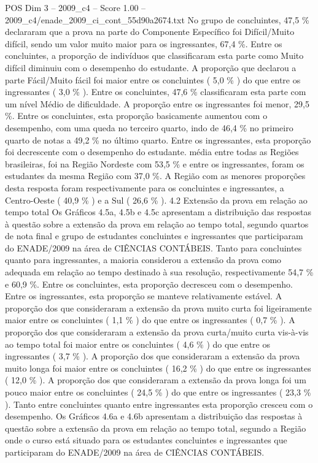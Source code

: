 \begin{textsample}{POS Dim 3 – 2009\_c4 – Score 1.00 – 2009\_c4/enade\_2009\_ci\_cont\_55d90a2674.txt}
No grupo de concluintes, 47,5 \% declararam que a prova na parte do Componente Específico foi Difícil/Muito difícil, sendo um valor muito maior para os ingressantes, 67,4 \%.
Entre os concluintes, a proporção de indivíduos que classificaram esta parte como Muito difícil diminuiu com o desempenho do estudante.
A proporção que declarou a parte Fácil/Muito fácil foi maior entre os concluintes ( 5,0 \% ) do que entre os ingressantes ( 3,0 \% ).
Entre os concluintes, 47,6 \% classificaram esta parte com um nível Médio de dificuldade.
A proporção entre os ingressantes foi menor, 29,5 \%.
Entre os concluintes, esta proporção basicamente aumentou com o desempenho, com uma queda no terceiro quarto, indo de 46,4 \% no primeiro quarto de notas a 49,2 \% no último quarto.
Entre os ingressantes, esta proporção foi decrescente com o desempenho do estudante. média entre todas as Regiões brasileiras, foi na Região Nordeste com 53,5 \% e entre os ingressantes, foram os estudantes da mesma Região com 37,0 \%.
A Região com as menores proporções desta resposta foram respectivamente para os concluintes e ingressantes, a Centro-Oeste ( 40,9 \% ) e a Sul ( 26,6 \% ). 4.2 Extensão da prova em relação ao tempo total Os Gráficos 4.5a, 4.5b e 4.5c apresentam a distribuição das respostas à questão sobre a extensão da prova em relação ao tempo total, segundo quartos de nota final e grupo de estudantes concluintes e ingressantes que participaram do ENADE/2009 na área de CIÊNCIAS CONTÁBEIS.
Tanto para concluintes quanto para ingressantes, a maioria considerou a extensão da prova como adequada em relação ao tempo destinado à sua resolução, respectivamente 54,7 \% e 60,9 \%.
Entre os concluintes, esta proporção decresceu com o desempenho.
Entre os ingressantes, esta proporção se manteve relativamente estável.
A proporção dos que consideraram a extensão da prova muito curta foi ligeiramente maior entre os concluintes ( 1,1 \% ) do que entre os ingressantes ( 0,7 \% ).
A proporção dos que consideraram a extensão da prova curta/muito curta vis-à-vis ao tempo total foi maior entre os concluintes ( 4,6 \% ) do que entre os ingressantes ( 3,7 \% ).
A proporção dos que consideraram a extensão da prova muito longa foi maior entre os concluintes ( 16,2 \% ) do que entre os ingressantes ( 12,0 \% ).
A proporção dos que consideraram a extensão da prova longa foi um pouco maior entre os concluintes ( 24,5 \% ) do que entre os ingressantes ( 23,3 \% ).
Tanto entre concluintes quanto entre ingressantes esta proporção cresceu com o desempenho.
Os Gráficos 4.6a e 4.6b apresentam a distribuição das respostas à questão sobre a extensão da prova em relação ao tempo total, segundo a Região onde o curso está situado para os estudantes concluintes e ingressantes que participaram do ENADE/2009 na área de CIÊNCIAS CONTÁBEIS.

\end{textsample}
